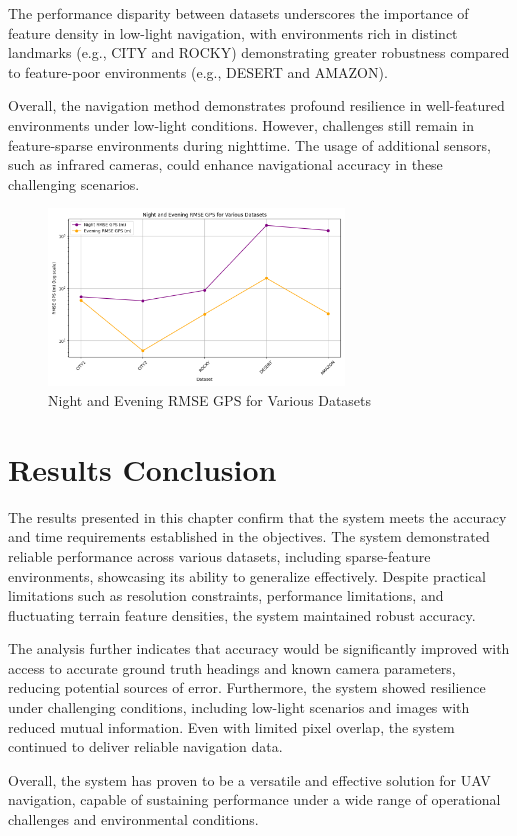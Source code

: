 The performance disparity between datasets underscores the importance of feature density in low-light navigation, with environments rich in distinct landmarks (e.g., CITY and ROCKY) demonstrating greater robustness compared to feature-poor environments (e.g., DESERT and AMAZON).

Overall, the navigation method demonstrates profound resilience in well-featured environments under low-light conditions. However, challenges still remain in feature-sparse environments during nighttime. The usage of additional sensors, such as infrared cameras, could enhance navigational accuracy in these challenging scenarios. 




    \begin{figure}[H]
        \centering
        \includegraphics[width=0.7\textwidth]{./Chapter 5/RESULTPLOTS/night_evening_rmse.png}
        \caption{Night and Evening RMSE GPS for Various Datasets}
        \label{fig:night_evening_rmse}
    \end{figure}

    

\section{Results Conclusion}

The results presented in this chapter confirm that the system meets the accuracy and time requirements established in the objectives. The system demonstrated reliable performance across various datasets, including sparse-feature environments, showcasing its ability to generalize effectively. Despite practical limitations such as resolution constraints, performance limitations, and fluctuating terrain feature densities, the system maintained robust accuracy.

The analysis further indicates that accuracy would be significantly improved with access to accurate ground truth headings and known camera parameters, reducing potential sources of error. Furthermore, the system showed resilience under challenging conditions, including low-light scenarios and images with reduced mutual information. Even with limited pixel overlap, the system continued to deliver reliable navigation data.

Overall, the system has proven to be a versatile and effective solution for UAV navigation, capable of sustaining performance under a wide range of operational challenges and environmental conditions.

